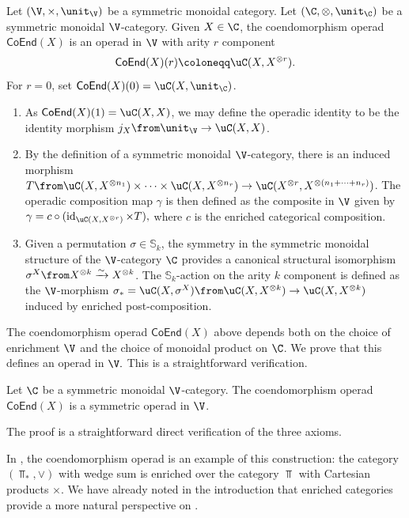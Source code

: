 \documentclass{tac}
\def\id{\operatorname{id}}
\def\bTop{{\Top_\ast}}
\newcommand{\coend}{\mathsf{CoEnd}}
\begin{document}
\begin{definition}
\label{cooo}
Let $(\V, \times, \unit_{\V})$ be a symmetric monoidal category. Let $(\C, \otimes, \unit_\C)$ be a symmetric monoidal $\V$-category. Given $X \in \C$, the coendomorphism operad $\coend(X)$ is an operad in $\V$ with arity $r$ component
\begin{equation*}
    \coend(X)(r) \coloneqq \uC(X, X^{\otimes r}).
\end{equation*}
For $r=0$, set $\coend (X)(0) =\uC(X, \unit_{\C})$.  

\begin{enumerate}
    \item
As $\coend(X)(1) = \uC(X, X)$, we may define the operadic identity to be the identity morphism $j_X\from \unit_\V \to \uC(X, X)$.
\item
By the definition of a symmetric monoidal $\V$-category, there is an induced morphism $T\from \uC(X, X^{\otimes n_1}) \times \cdots \times \uC(X, X^{\otimes n_r}) \to \uC(X^{\otimes r}, X^{\otimes(n_1 + \cdots + n_r)})$. The operadic composition map $\gamma$ is then defined as the composite in $\V$ given by 
$
\gamma = c \circ (\id_{\uC(X, X^{\otimes r})} \times T),
$
where $c$ is the enriched categorical composition.
\item
Given a permutation $\sigma \in \mathbb{S}_k$, the symmetry in the symmetric monoidal structure of the  $\V$-category $\C$ provides a canonical structural isomorphism $\sigma^X\from X^{\otimes k} \xrightarrow{\sim} X^{\otimes k}$. The $\mathbb{S}_k$-action on the arity $k$ component is defined as the $\V$-morphism $\sigma_\ast = \uC(X, \sigma^X) \from \uC(X, X^{\otimes k})\to \uC(X, X^{\otimes k})$ induced by enriched post-composition.
\end{enumerate}
\end{definition}
The coendomorphism operad $\coend(X)$ above depends both on the choice of enrichment $\V$ and the choice of monoidal product on $\C$. We prove that this defines an operad in $\V.$ This is a straightforward verification.
\begin{proposition}
    Let $\C$ be a symmetric monoidal $\V$-category. The coendomorphism operad $\coend(X)$ is a symmetric operad in $\V$.
\end{proposition}
The proof is a straightforward direct verification of the three axioms.
\begin{example}
\label{ourex}
    In \cite{me1}, the coendomorphism operad is an example of this construction: the category $(\bTop, \vee)$ with wedge sum is enriched over the category $\Top$ with Cartesian products $\times$. We have already noted in the introduction that enriched categories provide a more natural perspective on \cite[Remark 2.1]{me1}.
\end{example}
\end{document}
